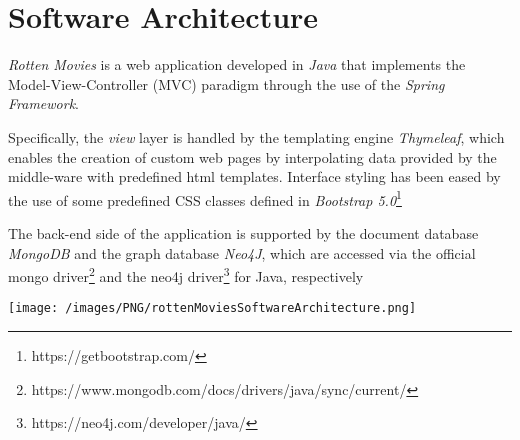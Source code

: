 %
%

\chapter{Software Architecture}
\emph{Rotten Movies} is a web application developed in \emph{Java} that implements the Model-View-Controller (MVC) paradigm through
the use of the \emph{Spring Framework}. 

Specifically, the \emph{view} layer is handled by the templating engine \emph{Thymeleaf}, 
which enables the creation of custom web pages by interpolating data provided by the middle-ware with predefined html templates.
Interface styling has been eased by the use of some predefined CSS classes defined in \emph{Bootstrap 5.0}\footnote{https://getbootstrap.com/}

The back-end side of the application is supported by the document database \emph{MongoDB} and the graph database \emph{Neo4J}, 
which are accessed via the official mongo driver\footnote{https://www.mongodb.com/docs/drivers/java/sync/current/} and the 
neo4j driver\footnote{https://neo4j.com/developer/java/} for Java, respectively

\hspace{2em}

\texttt{[image: /images/PNG/rottenMoviesSoftwareArchitecture.png]}




%